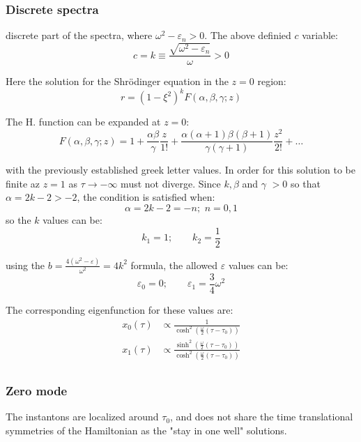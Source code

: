 \documentclass[12pt,a4paper]{article}
\numberwithin{equation}{section}
\begin{document}
\subsubsection{Discrete spectra}
discrete part of the spectra, where $\omega^2 - \varepsilon_n > 0$. The above definied $c$ variable:
\begin{equation}
c = k \equiv \frac{\sqrt{\omega^2 - \varepsilon_n}}{\omega} > 0
\end{equation}

Here the solution for the Shrödinger equation in the $z=0$ region:
\begin{equation}
r = (1-\xi^2)^k F(\alpha, \beta, \gamma;z)
\end{equation}

The H. function can be expanded at $z=0$:
\begin{equation}
F(\alpha, \beta, \gamma;z) = 1 + \frac{\alpha\beta}{\gamma}\frac{z}{1!} + \frac{\alpha(\alpha + 1)\beta(\beta + 1)}{\gamma (\gamma + 1)} \frac{z^2}{2!} + \dots
\end{equation}

with the previously established greek letter values. In order for this solution to be finite az $z=1$ as $\tau \rightarrow -\infty$ must not diverge. Since $k, \beta$ and $\gamma$ $>0$ so that $\alpha = 2k -2 >-2$, the condition is satisfied when:
\begin{equation}
\alpha = 2k - 2 = -n; \,\, n= 0,1
\end{equation}
so the $k$ values can be:
\begin{equation}
k_1 = 1; \qquad k_2 = \frac{1}{2}
\end{equation}

using the $b=\frac{4(\omega^2 - \varepsilon)}{\omega^2}=4k^2$ formula, the allowed $\varepsilon$ values can be:
\begin{equation}
\varepsilon_0 = 0; \qquad \varepsilon_1 = \frac{3}{4}\omega^2
\end{equation}

The corresponding eigenfunction for these values are:
\begin{align}
x_0(\tau) &\propto \frac{1}{\cosh^2\left( \frac{\omega}{2} (\tau - \tau_0)  \right)} \\
x_1(\tau) &\propto \frac{\sinh^2 \left( \frac{\omega}{2} (\tau - \tau_0)  \right)}{\cosh^2\left( \frac{\omega}{2} (\tau - \tau_0)  \right)} \\
\end{align}

\subsubsection{Zero mode}
The instantons are localized around $\tau_0$, and does not share the time translational symmetries of the Hamiltonian as the "stay in one well" solutions. 
\end{document}
